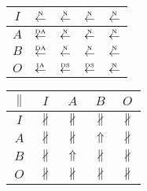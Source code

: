 \begin{table}[htbp]
\begin{subtable}{1\textwidth}
\begin{minipage}[b]{0.3\textwidth}
\begin{tabular}{|c|c|c|c|c|}
        $I$ & $\overset{\text{\tiny{N}}}{\leftarrow}$ & $\overset{\text{\tiny{N}}}{\leftarrow}$ & $\overset{\text{\tiny{N}}}{\leftarrow}$ & $\overset{\text{\tiny{N}}}{\leftarrow}$\\ \hline
        $A$ & $\overset{\text{\tiny{DA}}}{\leftarrow}$ & $\overset{\text{\tiny{N}}}{\leftarrow}$ & $\overset{\text{\tiny{N}}}{\leftarrow}$ & $\overset{\text{\tiny{N}}}{\leftarrow}$\\ \hline
        $B$ & $\overset{\text{\tiny{DA}}}{\leftarrow}$ & $\overset{\text{\tiny{N}}}{\leftarrow}$ & $\overset{\text{\tiny{N}}}{\leftarrow}$ & $\overset{\text{\tiny{N}}}{\leftarrow}$\\ \hline
        $O$ & $\overset{\text{\tiny{IA}}}{\leftarrow}$ & $\overset{\text{\tiny{DS}}}{\leftarrow}$ & $\overset{\text{\tiny{DS}}}{\leftarrow}$ & $\overset{\text{\tiny{N}}}{\leftarrow}$\\ \hline
      \end{tabular}
    \end{minipage}
    \begin{minipage}[b]{0.3\textwidth}
      \centering
      \begin{tabular}{|c|c|c|c|c|} \hline
        $\parallel$ & $I$ & $A$ & $B$ & $O$\\ \hline
        $I$ & $\nparallel$ & $\nparallel$ & $\nparallel$ & $\nparallel$\\ \hline
        $A$ & $\nparallel$ & $\nparallel$ & $\Uparrow$ & $\nparallel$\\ \hline
        $B$ & $\nparallel$ & $\Uparrow$ & $\nparallel$ & $\nparallel$\\ \hline
        $O$ & $\nparallel$ & $\nparallel$ & $\nparallel$ & $\nparallel$\\ \hline
      \end{tabular}
    \end{minipage}
  \end{subtable}


\end{table}
